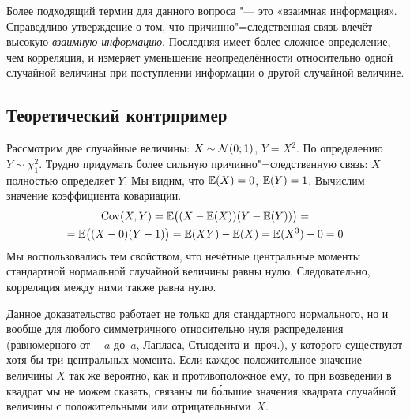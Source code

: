 \documentclass[11pt]{article}
\begin{document}
Более подходящий термин для данного вопроса "--- это «взаимная информация». Справедливо утверждение о том, что причинно"=следственная связь влечёт высокую \textit{взаимную информацию}. Последняя имеет более сложное определение, чем корреляция, и измеряет уменьшение неопределённости относительно одной случайной величины при поступлении информации о другой случайной величине.




\subsection{Теоретический контрпример}

Рассмотрим две случайные величины: $X\sim\mathcal{N}(0;1)$, $Y=X^2$. По определению $Y\sim \chi^2_1$. Трудно придумать более сильную причинно"=следственную связь: $X$ полностью определяет $Y$. Мы видим, что $\mathbb{E}(X)=0$, $\mathbb{E}(Y)=1$. Вычислим значение коэффициента ковариации. 
\begin{multline*}
\operatorname{Cov}(X,Y) = \mathbb{E}\bigl( (X - \mathbb{E}(X)) (Y - \mathbb{E}(Y)) \bigr) = \\
 = \mathbb{E}\bigl( (X-0)(Y-1) \bigr) = \mathbb{E}(XY) - \mathbb{E}(X) = \mathbb{E}(X^3) - 0 = 0
\end{multline*}
Мы воспользовались тем свойством, что нечётные центральные моменты стандартной нормальной случайной величины равны нулю. Следовательно, корреляция между ними также равна нулю.

Данное доказательство работает не только для стандартного нормального, но и вообще для любого симметричного относительно нуля распределения (равномерного от~$-a$ до~$a$, Лапласа, Стьюдента и~проч.), у которого существуют хотя бы три центральных момента. Если каждое положительное значение величины $X$ так же вероятно, как и противоположное ему, то при возведении в квадрат мы не можем сказать, связаны ли б\'{о}льшие значения квадрата случайной величины с положительными или отрицательными~$X$. 
\end{document}

